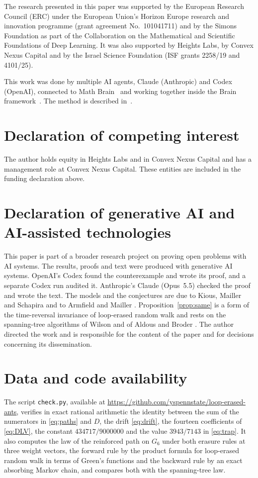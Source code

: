 \documentclass[11pt]{amsart}
\theoremstyle{remark}
\begin{document}
The research presented in this paper was supported by the European Research Council (ERC) under the European Union's Horizon Europe research and innovation programme (grant agreement No.~101041711) and by the Simons Foundation as part of the Collaboration on the Mathematical and Scientific Foundations of Deep Learning. It was also supported by Heights Labs, by Convex Nexus Capital and by the Israel Science Foundation (ISF grants 2258/19 and 4101/25).

This work was done by multiple AI agents, Claude (Anthropic) and Codex (OpenAI), connected to Math Brain~\cite{MathBrainRepo} and working together inside the Brain framework~\cite{BrainFramework}. The method is described in~\cite{MathBrainPaper}.

\section*{Declaration of competing interest}

The author holds equity in Heights Labs and in Convex Nexus Capital and has a management role at Convex Nexus Capital. These entities are included in the funding declaration above.

\section*{Declaration of generative AI and AI-assisted technologies}

This paper is part of a broader research project on proving open problems with AI systems. The results, proofs and text were produced with generative AI systems. OpenAI's Codex found the counterexample and wrote its proof, and a separate Codex run audited it. Anthropic's Claude (Opus~5.5) checked the proof and wrote the text. The models and the conjectures are due to Kious, Mailler and Schapira \cite{KMS22a} and to Armfield and Mailler \cite{AM26}. Proposition~\ref{prop:same} is a form of the time-reversal invariance of loop-erased random walk and rests on the spanning-tree algorithms of Wilson \cite{Wil96} and of Aldous \cite{Ald90} and Broder \cite{Bro89}. The author directed the work and is responsible for the content of the paper and for decisions concerning its dissemination.

\section*{Data and code availability}

The script \texttt{check.py}, available at \url{https://github.com/yspennstate/loop-erased-ants}, verifies in exact rational arithmetic the identity between the sum of the numerators in \eqref{eq:paths} and $D$, the drift \eqref{eq:drift}, the fourteen coefficients of \eqref{eq:DLV}, the constant $434717/9000000$ and the value $3943/7143$ in \eqref{eq:trap}. It also computes the law of the reinforced path on $G_6$ under both erasure rules at three weight vectors, the forward rule by the product formula for loop-erased random walk in terms of Green's functions and the backward rule by an exact absorbing Markov chain, and compares both with the spanning-tree law.
\end{document}
